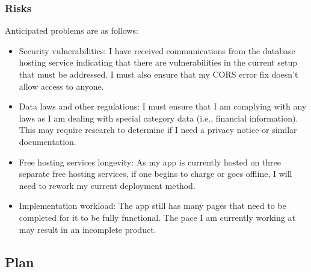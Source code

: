 \documentclass[11pt]{article}
\begin{document}
\subsubsection{Risks}\label{risks}
Anticipated problems are as follows:
\begin{itemize}
    \item Security vulnerabilities: I have received communications from the database hosting service indicating that there are vulnerabilities in the current setup that must be addressed. I must also ensure that my CORS error fix doesn’t allow access to anyone.
    \item Data laws and other regulations: I must ensure that I am complying with any laws as I am dealing with special category data (i.e., financial information). This may require research to determine if I need a privacy notice or similar documentation.
    \item Free hosting services longevity: As my app is currently hosted on three separate free hosting services, if one begins to charge or goes offline, I will need to rework my current deployment method.
    \item Implementation workload: The app still has many pages that need to be completed for it to be fully functional. The pace I am currently working at may result in an incomplete product.
\end{itemize}


\subsection{Plan}\label{plan}
\end{document}
